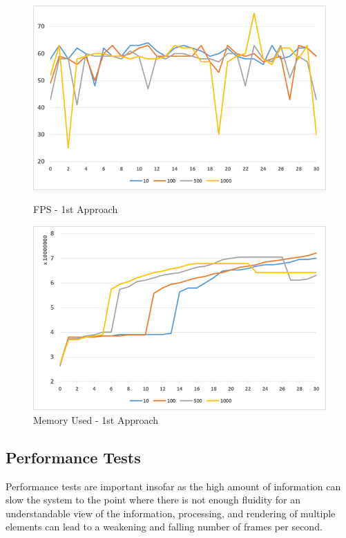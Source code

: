 \documentclass[letterpaper, 10 pt, conference]{ieeeconf}  %
\begin{document}
\begin{figure}[!ht]
    \centering
    \begin{minipage}[b]{0.48\textwidth}
        \centering
        \includegraphics[width=\textwidth]{Figures/fps1.png}
        \caption{FPS - 1st Approach}
            \label{fig:fps1}
    \end{minipage}
    \hfill
    \begin{minipage}[b]{0.48\textwidth}
        \centering
        \includegraphics[width=\textwidth]{Figures/mem1.png}
        \caption{Memory Used - 1st Approach}
            \label{fig:mem1}
    \end{minipage}
\end{figure}

\subsection{Performance Tests}
\label{subsection:performance}
Performance tests are important insofar as the high amount of information can slow the system to the point where there is not enough fluidity for an understandable view of the information, processing, and rendering of multiple elements can lead to a weakening and falling number of frames per second.
\end{document}

